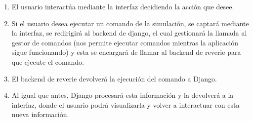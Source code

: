 \begin{enumerate}
	\item El usuario interactúa mediante la interfaz decidiendo la acción que desee.
	
	\item Si el usuario desea ejecutar un comando de la simulación, se captará mediante la interfaz, se redirigirá al backend de django, el cual gestionará la llamada al gestor de comandos (nos permite ejecutar comandos mientras la aplicación sigue funcionando) y esta se encargará de llamar al backend de reverie para que ejecute el comando.
	
	\item El backend de reverie devolverá la ejecución del comando a Django.
	
	\item Al igual que antes, Django procesará esta información y la devolverá a la interfaz, donde el usuario podrá visualizarla y volver a interactuar con esta nueva información.
	
\end{enumerate}

